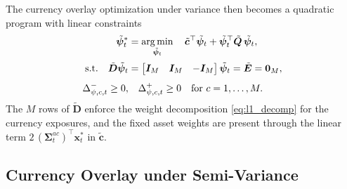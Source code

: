 The currency overlay optimization under variance then becomes a quadratic program with linear constraints
\begin{equation}
\begin{aligned}
    \tilde{\bm{\psi}}_t^* &= \operatorname*{arg\,min}_{\tilde{\bm{\psi}}_t} \quad
     \tilde{\bm{c}}^\top \tilde{\bm{\psi}}_t + \tilde{\bm{\psi}}_t^\top \tilde{\bm{Q}}\, \tilde{\bm{\psi}}_t, \\[2pt]
    \text{s.t.} \quad
    \tilde{\bm{D}} \tilde{\bm{\psi}}_t &=
    \begin{bmatrix} \bm{I}_M & \bm{I}_M & -\bm{I}_M \end{bmatrix} \tilde{\bm{\psi}}_t
    = \tilde{\bm{E}} = \bm{0}_M, \\[4pt]
    \Delta_{\psi,c,t}^- \ge 0, & \quad \Delta_{\psi,c,t}^+ \ge 0
    \quad \text{for } c = 1, \dots, M.
\end{aligned}
\end{equation}
The $M$ rows of $\tilde{\bm{D}}$ enforce the weight decomposition \eqref{eq:l1_decomp} for the currency exposures, and
the fixed asset weights are present through the linear term $2\, (\bm{\Sigma}^{ac}_t)^\top \bm{x}_t^*$ in $\tilde{\bm{c}}$.

\subsection{Currency Overlay under Semi-Variance} \label{app:mv_svar_sep_curr}

